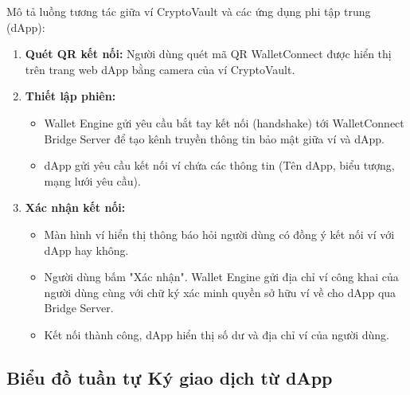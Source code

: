 \documentclass[a4paper]{report}
\begin{document}
Mô tả luồng tương tác giữa ví CryptoVault và các ứng dụng phi tập trung (dApp):
\begin{enumerate}
    \item \textbf{Quét QR kết nối:} Người dùng quét mã QR WalletConnect được hiển thị trên trang web dApp bằng camera của ví CryptoVault.
    \item \textbf{Thiết lập phiên:}
    \begin{itemize}
        \item Wallet Engine gửi yêu cầu bắt tay kết nối (handshake) tới WalletConnect Bridge Server để tạo kênh truyền thông tin bảo mật giữa ví và dApp.
        \item dApp gửi yêu cầu kết nối ví chứa các thông tin (Tên dApp, biểu tượng, mạng lưới yêu cầu).
    \end{itemize}
    \item \textbf{Xác nhận kết nối:}
    \begin{itemize}
        \item Màn hình ví hiển thị thông báo hỏi người dùng có đồng ý kết nối ví với dApp hay không.
        \item Người dùng bấm "Xác nhận". Wallet Engine gửi địa chỉ ví công khai của người dùng cùng với chữ ký xác minh quyền sở hữu ví về cho dApp qua Bridge Server.
        \item Kết nối thành công, dApp hiển thị số dư và địa chỉ ví của người dùng.
    \end{itemize}
\end{enumerate}

\subsection{Biểu đồ tuần tự Ký giao dịch từ dApp}

\end{document}
